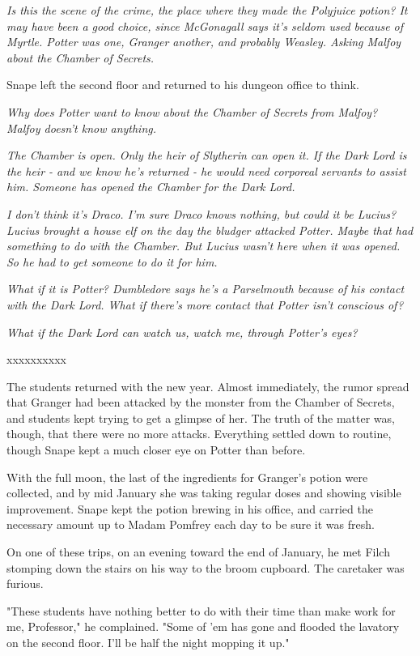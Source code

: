 \documentclass[a4paper,11pt]{article}
\begin{document}
\emph{Is this the scene of the crime, the place where they made the Polyjuice potion? It may have been a good choice, since McGonagall says it's seldom used because of Myrtle. Potter was one, Granger another, and probably Weasley. Asking Malfoy about the Chamber of Secrets.}

Snape left the second floor and returned to his dungeon office to think.

\emph{Why does Potter want to know about the Chamber of Secrets from Malfoy? Malfoy doesn't know anything.}

\emph{The Chamber is open. Only the heir of Slytherin can open it. If the Dark Lord is the heir - and we know he's returned - he would need corporeal servants to assist him. Someone has opened the Chamber for the Dark Lord.}

\emph{I don't think it's Draco. I'm sure Draco knows nothing, but could it be Lucius? Lucius brought a house elf on the day the bludger attacked Potter. Maybe that had something to do with the Chamber. But Lucius wasn't here when it was opened. So he had to get someone to do it for him.}

\emph{What if it is Potter? Dumbledore says he's a Parselmouth because of his contact with the Dark Lord. What if there's more contact that Potter isn't conscious of?}

\emph{What if the Dark Lord can watch us, watch me, through Potter's eyes?}

xxxxxxxxxx

The students returned with the new year. Almost immediately, the rumor spread that Granger had been attacked by the monster from the Chamber of Secrets, and students kept trying to get a glimpse of her. The truth of the matter was, though, that there were no more attacks. Everything settled down to routine, though Snape kept a much closer eye on Potter than before.

With the full moon, the last of the ingredients for Granger's potion were collected, and by mid January she was taking regular doses and showing visible improvement. Snape kept the potion brewing in his office, and carried the necessary amount up to Madam Pomfrey each day to be sure it was fresh.

On one of these trips, on an evening toward the end of January, he met Filch stomping down the stairs on his way to the broom cupboard. The caretaker was furious.

"These students have nothing better to do with their time than make work for me, Professor," he complained. "Some of 'em has gone and flooded the lavatory on the second floor. I'll be half the night mopping it up."
\end{document}
